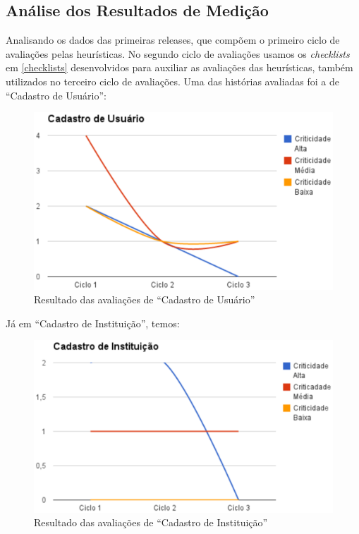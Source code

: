 \subsection{Análise dos Resultados de Medição}

Analisando os dados das primeiras releases, que compõem o primeiro ciclo de avaliações pelas heurísticas. No segundo ciclo de avaliações usamos os \textit{checklists} em \ref{checklists} desenvolvidos para auxiliar as avaliações das heurísticas, também utilizados no terceiro ciclo de avaliações. Uma das histórias avaliadas foi a de ``Cadastro de Usuário'':

\begin{figure}[h!]
    	\centering
    	\includegraphics[keepaspectratio=true,scale=0.62]
      		{figuras/graf01.eps}
    	\caption{Resultado das avaliações de ``Cadastro de Usuário''}
    	\label{avaliacaouser}
\end{figure}

Já em ``Cadastro de Instituição'', temos:

\begin{figure}[h!]
    	\centering
    	\includegraphics[keepaspectratio=true,scale=0.62]
      		{figuras/graf02.eps}
    	\caption{Resultado das avaliações de ``Cadastro de Instituição''}
    	\label{avaliacaoinstitucion}
\end{figure}

